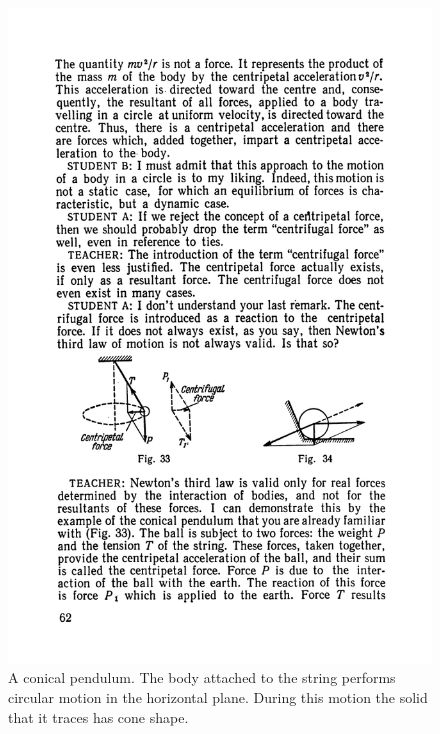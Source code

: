 \documentclass[a4paper,sfsidenotes]{tufte-book}
\begin{document}
\begin{figure}
\centering
\includegraphics[width=0.6\linewidth]{fig-033a.pdf}
\caption{A conical pendulum. The body attached to the string performs circular motion in the horizontal plane. During this motion the solid that it traces has cone shape.}
\label{fig-33}
\end{figure}
\end{document}
